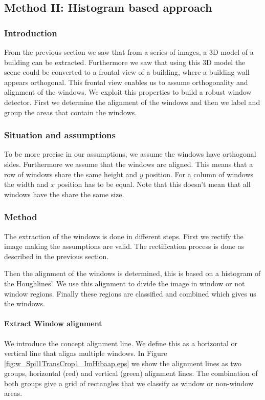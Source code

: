 \subsection{Method II: Histogram based approach} 
\subsubsection{Introduction}
From the previous section we saw that from a series of images, a 3D model of a
building can be extracted. Furthermore we saw that using this 3D model the
scene could be converted to a frontal view of a building, where a building wall
appears orthogonal.  This frontal view enables us to assume orthogonality and
alignment of the windows. 
We exploit this properties to build a robust window detector. First we determine
the alignment of the windows and then we label and group the areas that
contain the windows. 

\subsubsection{Situation and assumptions}
To be more precise in our assumptions, we assume the windows have orthogonal
sides.  Furthermore we assume that the windows are aligned. This means that a
row of windows share the same height and $y$ position. For a column of windows
the width and $x$ position has to be equal.  Note that this doesn't mean that
all windows have the share the same size.

\subsubsection{Method}
The extraction of the windows is done in different steps. First we rectify the 
image making the assumptions are valid. The rectification process is done as
described in the previous section. 

Then the alignment of the windows is determined, this is based on a histogram 
of the Houghlines'. We use this alignment to divide the
image in window or not window regions.  Finally these regions are classified
and combined which gives us the windows.



\paragraph{Extract Window alignment}
We introduce the concept alignment line. We define this as a horizontal or
vertical line that aligns multiple windows. In Figure
\ref{fig:w_Spil1TransCrop1_ImHibaap.eps}
we show the alignment lines as two groups, horizontal (red) and
vertical (green) alignment lines.  The combination of both groups give a grid of
rectangles that we classify as window or non-window areas.\\

